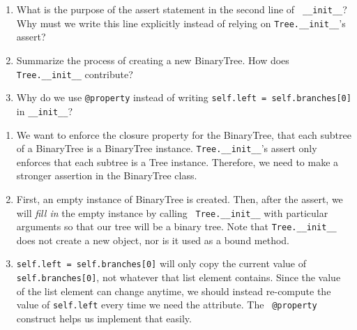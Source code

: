 \question
\renewcommand{\theenumi}{\alph{enumi}}

\begin{enumerate}
\item What is the purpose of the assert statement in the second line of {\tt
    \_\_init\_\_}?  Why must we write this line explicitly instead of relying
    on {\tt Tree.\_\_init\_\_}'s assert?

\item Summarize the process of creating a new BinaryTree. How does {\tt
    Tree.\_\_init\_\_} contribute?

\item Why do we use {\tt @property} instead of writing {\tt self.left =
    self.branches[0]} in {\tt \_\_init\_\_}?
\end{enumerate}

\begin{solution}[1in]
\begin{enumerate}
\item We want to enforce the closure property for the BinaryTree, that each
    subtree of a BinaryTree is a BinaryTree instance. {\tt Tree.\_\_init\_\_}'s
    assert only enforces that each subtree is a Tree instance. Therefore, we
    need to make a stronger assertion in the BinaryTree class.

\item First, an empty instance of BinaryTree is created. Then, after the
    assert, we will \emph{fill in} the empty instance by calling {\tt
    Tree.\_\_init\_\_} with particular arguments so that our tree will be a
    binary tree. Note that  {\tt Tree.\_\_init\_\_} does not create a new
    object, nor is it used as a bound method.
\item {\tt self.left = self.branches[0]} will only copy the current value of
    {\tt self.branches[0]}, not whatever that list element contains. Since the
    value of the list element can change anytime, we should instead re-compute
    the value of {\tt self.left} every time we need the attribute. The {\tt
    @property}  construct helps us implement that easily.
\end{enumerate}
\end{solution}
